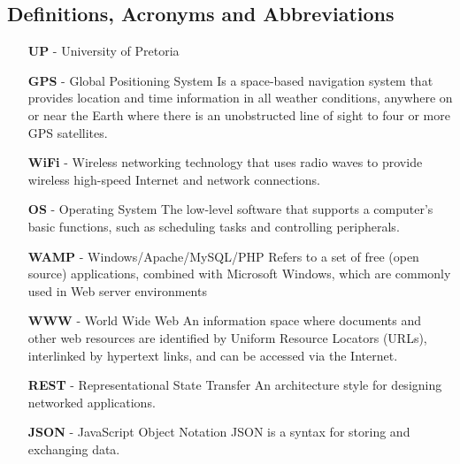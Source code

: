 \documentclass[12pt,a4paper]{article}
\begin{document}
		\subsection{Definitions, Acronyms and Abbreviations}
			\begin{itemize}
				\item [\textbf{UP}] - University of Pretoria
				
				\item [\textbf{GPS}] - Global Positioning System \newline
				 Is a space-based navigation system that provides location and time information 
				 in all weather conditions, anywhere on or near the Earth where there is an 
				 unobstructed line of sight to four or more GPS satellites.
				 
				\item [\textbf{WiFi}] - \newline
				Wireless networking technology that uses radio waves to provide wireless 
				high-speed Internet and network connections.
				
				\item [\textbf{OS}] - Operating System \newline
				The low-level software that supports a computer's basic functions, such as 
				scheduling tasks and controlling peripherals.
				
				\item [\textbf{WAMP}] - Windows/Apache/MySQL/PHP \newline
				Refers to a set of free (open source) applications, combined with Microsoft 
				Windows, which are commonly used in Web server environments
				
				\item [\textbf{WWW}] - World Wide Web \newline
				An information space where documents and other web resources are identified 
				by Uniform Resource Locators (URLs), interlinked by hypertext links, and can 
				be accessed via the Internet.
				
				\item [\textbf{REST}] - Representational State Transfer \newline
				An architecture style for designing networked applications.
				
				\item [\textbf{JSON}] - JavaScript Object Notation \newline
				JSON is a syntax for storing and exchanging data.
				

\end{itemize}
\end{document}
